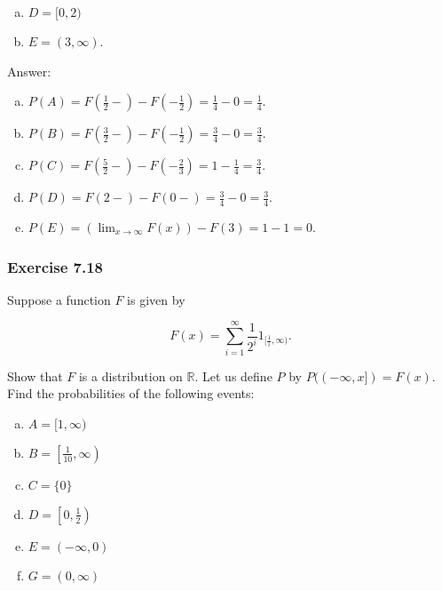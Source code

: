 \documentclass{article}
\begin{document}
{\begin{enumerate}[a)]
\item $D = [0,2)$

\item $E = (3,\infty)$. 
\end{enumerate}

Answer:

\begin{enumerate}[a)]
\item $P(A) = F\left(\frac{1}{2}-\right) - F\left(-\frac{1}{2}\right) = \frac{1}{4} - 0 = \frac{1}{4}$.

\item $P(B) = F\left(\frac{3}{2}-\right)-F\left(-\frac{1}{2}\right) =\frac{3}{4} - 0 = \frac{3}{4}$.

\item $P(C) = F\left(\frac{5}{2}-\right)-F\left(-\frac{2}{3}\right) = 1- \frac{1}{4} = \frac{3}{4}$.

\item $P(D) = F(2-) - F(0-) = \frac{3}{4} - 0 = \frac{3}{4}$.

\item $P(E) = (\lim_{x\rightarrow\infty} F(x)) - F(3) = 1 - 1 = 0$. 
\end{enumerate}

\subsubsection*{Exercise 7.18}

Suppose a function $F$ is given by

$$
F(x) = \sum_{i=1}^\infty \frac{1}{2^i}1_{[\frac{1}{i}, \infty)} .
$$

Show that $F$ is a distribution on $\mathbb{R}$. Let us define $P$ by $P((-\infty, x]) = F(x)$. Find the probabilities of the following events:

\begin{enumerate}[a)]
\item $A = [1,\infty)$

\item $B = \left[\frac{1}{10}, \infty\right)$

\item $C = \{0\}$

\item $D = \left[0, \frac{1}{2}\right)$ 

\item $E = (-\infty , 0)$

\item $G = (0,\infty)$
\end{enumerate}

}
\end{document}
